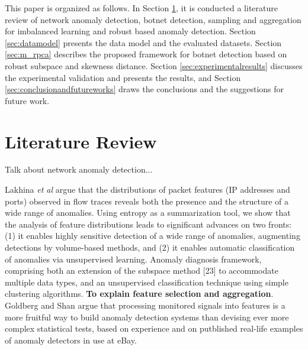 \documentclass[review]{elsarticle}
\begin{document}
This paper is organized as follows. In Section \ref{sec:review}, it is conducted a literature review of network anomaly detection, botnet detection, sampling and aggregation for imbalanced learning and robust based anomaly detection. Section \ref{sec:datamodel} presents the data model and the evaluated datasets. Section \ref{sec:m_rpca} describes the proposed framework for botnet detection based on robust subspace and skewness distance. Section \ref{sec:experimentalresults} discusses the experimental validation and presents the results, and Section \ref{sec:conclusionandfutureworks} draws the conclusions and the suggestions for future work.

\section{Literature Review}
\label{sec:review}

Talk about network anomaly detection... 

Lakhina \emph{et al} \cite{lakhina2005mining} argue that the distributions of packet features (IP addresses and ports) observed in flow traces reveals both the presence and the structure of a wide range of anomalies. Using entropy as a summarization tool, we show that the analysis of feature distributions leads to significant advances on two fronts: (1) it enables highly sensitive detection of a wide range of anomalies, augmenting detections by volume-based methods, and (2) it enables automatic classification of anomalies via unsupervised learning. Anomaly diagnosis framework, comprising both an extension of the subspace method [23] to accommodate multiple data types, and an unsupervised classification technique using simple clustering algorithms. \textbf{To explain feature selection and aggregation}. Goldberg and Shan \cite{goldberg2015importance} argue that processing monitored signals into features is a more fruitful way to build anomaly detection systems than devising ever more complex statistical tests, based on experience and  on putblished real-life examples of anomaly detectors in use at eBay. 
\end{document}
